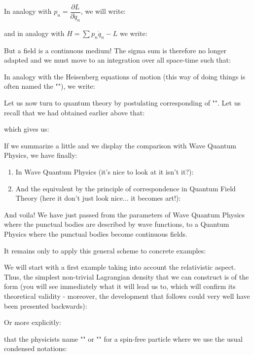 	In analogy with $p_n=\dfrac{\partial L}{\partial \dot{q}_n}$, we will write:
	
	and in analogy with $H=\displaystyle\sum p_n\dot{q}_n-L$ we write:
	
	But a field is a continuous medium! The sigma sum  is therefore no longer adapted and we must move to an integration over all space-time such that:
	
	In analogy with the Heisenberg equations of motion (this way of doing things is often named the ""), we write:
	
	Let us now turn to quantum theory by postulating corresponding of "". Let us recall that we had obtained earlier above that:
	
	which gives us:
	
	If we summarize a little and we display the comparison with Wave Quantum Physics, we have finally:
	\begin{enumerate}
		\item In Wave Quantum Physics (it's nice to look at it isn't it?):
		
		
		\item And the equivalent by the principle of correspondence in Quantum Field Theory (here it don't just look nice... it becomes art!):
		
	\end{enumerate}
	And voila! We have just passed from the parameters of Wave Quantum Physics where the punctual bodies are described by wave functions, to a Quantum Physics where the punctual bodies become continuous fields.

	It remains only to apply this general scheme to concrete examples:

	We will start with a first example taking into account the relativistic aspect. Thus, the simplest non-trivial Lagrangian density that we can construct is of the form (you will see immediately what it will lead us to, which will confirm its theoretical validity - moreover, the development that follows could very well have been presented backwards):
	
	Or more explicitly:
	
	that the physicists name "" or "" for a spin-free particle where we use the usual condensed notations:
	
